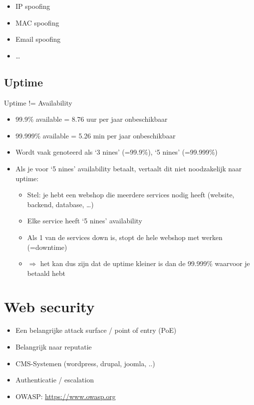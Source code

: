 \documentclass{article}
\begin{document}
\begin{itemize}
    \item IP spoofing
    \item MAC spoofing
    \item Email spoofing
    \item \dots
\end{itemize}

\subsection{Uptime}

Uptime != Availability

\begin{itemize}
    \item 99.9\% available = 8.76 uur per jaar onbeschikbaar
    \item 99.999\% available = 5.26 min per jaar onbeschikbaar
    \item Wordt vaak genoteerd als `3 nines' (=99.9\%), `5 nines' (=99.999\%)
    \item Als je voor `5 nines' availability betaalt, vertaalt dit niet noodzakelijk naar uptime:
    \begin{itemize}
        \item Stel: je hebt een webshop die meerdere services nodig heeft (website, backend, database, \dots)
        \item Elke service heeft `5 nines' availability
        \item Als 1 van de services down is, stopt de hele webshop met werken (=downtime)
        \item $\Rightarrow$ het kan dus zijn dat de uptime kleiner is dan de 99.999\% waarvoor je betaald hebt
    \end{itemize}

\end{itemize}

\section{Web security}

\begin{itemize}
    \item Een belangrijke attack surface / point of entry (PoE)
    \item Belangrijk naar reputatie
    \item CMS-Systemen  (wordpress, drupal, joomla, ..)
    \item Authenticatie / escalation
    \item OWASP: \url{https://www.owasp.org}
\end{itemize}
\end{document}
